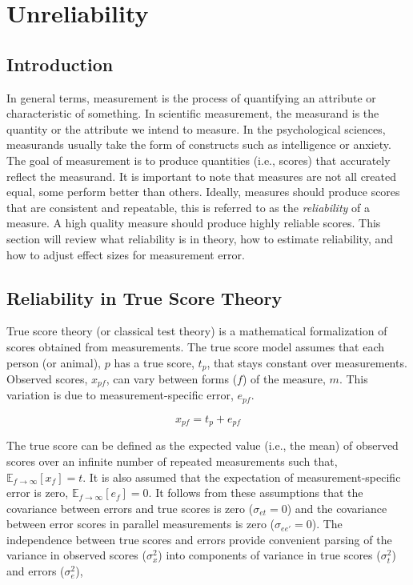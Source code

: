 \documentclass[
  letterpaper,
  DIV=11,
  numbers=noendperiod]{scrreprt}
\begin{document}
\hypertarget{unreliability}{%
\chapter{Unreliability}\label{unreliability}}

\hypertarget{introduction-1}{%
\section{Introduction}\label{introduction-1}}

In general terms, measurement is the process of quantifying an attribute
or characteristic of something. In scientific measurement, the measurand
is the quantity or the attribute we intend to measure. In the
psychological sciences, measurands usually take the form of constructs
such as intelligence or anxiety. The goal of measurement is to produce
quantities (i.e., scores) that accurately reflect the measurand. It is
important to note that measures are not all created equal, some perform
better than others. Ideally, measures should produce scores that are
consistent and repeatable, this is referred to as the \emph{reliability}
of a measure. A high quality measure should produce highly reliable
scores. This section will review what reliability is in theory, how to
estimate reliability, and how to adjust effect sizes for measurement
error.

\hypertarget{sec-true-score-theory}{%
\section{Reliability in True Score Theory}\label{sec-true-score-theory}}

True score theory (or classical test theory) is a mathematical
formalization of scores obtained from measurements. The true score model
assumes that each person (or animal), \(p\) has a true score, \(t_p\),
that stays constant over measurements. Observed scores, \(x_{pf}\), can
vary between forms (\(f\)) of the measure, \(m\). This variation is due
to measurement-specific error, \(e_{pf}\).

\[
x_{pf} = t_p+e_{pf}
\]

The true score can be defined as the expected value (i.e., the mean) of
observed scores over an infinite number of repeated measurements such
that, \(\mathbb{E}_{f\rightarrow\infty}[x_{f}]=t\). It is also assumed
that the expectation of measurement-specific error is zero,
\(\mathbb{E}_{f\rightarrow\infty}[e_{f}]=0\). It follows from these
assumptions that the covariance between errors and true scores is zero
(\(\sigma_{et}=0\)) and the covariance between error scores in parallel
measurements is zero (\(\sigma_{e e'}=0\)). The independence between
true scores and errors provide convenient parsing of the variance in
observed scores (\(\sigma^2_{x}\)) into components of variance in true
scores (\(\sigma_t^2\)) and errors (\(\sigma_{e}^2\)),
\end{document}
